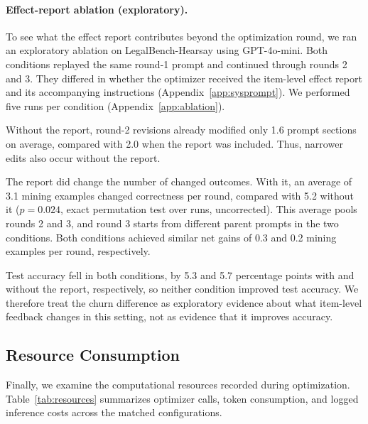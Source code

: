 \documentclass[11pt]{article}
\begin{document}
\paragraph{Effect-report ablation (exploratory).}
To see what the effect report contributes beyond the optimization round, we ran an exploratory ablation on LegalBench-Hearsay using GPT-4o-mini. Both conditions replayed the same round-1 prompt and continued through rounds 2 and 3. They differed in whether the optimizer received the item-level effect report and its accompanying instructions (Appendix~\ref{app:sysprompt}). We performed five runs per condition (Appendix~\ref{app:ablation}).

Without the report, round-2 revisions already modified only 1.6 prompt sections on average, compared with 2.0 when the report was included. Thus, narrower edits also occur without the report.

The report did change the number of changed outcomes. With it, an average of 3.1 mining examples changed correctness per round, compared with 5.2 without it ($p=0.024$, exact permutation test over runs, uncorrected). This average pools rounds 2 and 3, and round 3 starts from different parent prompts in the two conditions. Both conditions achieved similar net gains of 0.3 and 0.2 mining examples per round, respectively.

Test accuracy fell in both conditions, by 5.3 and 5.7 percentage points with and without the report, respectively, so neither condition improved test accuracy. We therefore treat the churn difference as exploratory evidence about what item-level feedback changes in this setting, not as evidence that it improves accuracy.

\subsection{Resource Consumption}
\label{sec:resources}

Finally, we examine the computational resources recorded during optimization. Table~\ref{tab:resources} summarizes optimizer calls, token consumption, and logged inference costs across the matched configurations.
\end{document}
